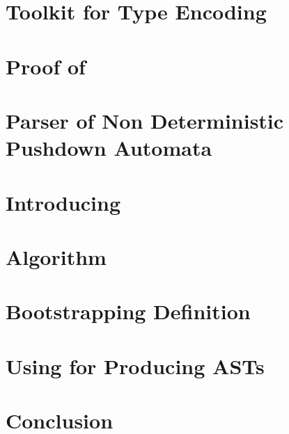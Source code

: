 \documentclass[a4paper,USenglish]{lipics}
\begin{document}
\section{Toolkit for Type Encoding}
\label{Section:toolkit}
%

\section{Proof of }
\label{Section:proof}


\section{Parser of Non Deterministic Pushdown Automata}
\label{Section:bridge}


\section{Introducing \Self}
\label{Section:fajita}


\section{Algorithm}
\label{Section:algorithm}


\section{Bootstrapping Definition}
\label{Section:bootstrapping}


\section{Using \Self for Producing ASTs}
\label{Section:AST}


\section{Conclusion}
\label{Section:zz}
%

\small

\end{document}
